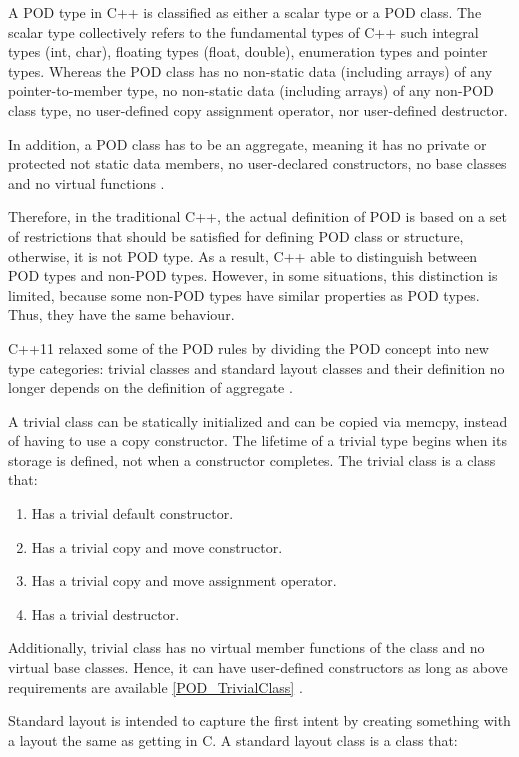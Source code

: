 \documentclass[11pt]{report}
\begin{document}
A POD type in C++ is classified as either a scalar type or a POD class. The scalar type collectively refers to the fundamental types of C++ such integral types (int, char), floating types (float, double), enumeration types and pointer types. Whereas the POD class has no non-static data (including arrays) of any pointer-to-member type, no non-static data (including arrays) of any non-POD class type, no user-defined copy assignment operator, nor user-defined destructor.


In addition, a POD class has to be an aggregate, meaning it has no private or protected not static data members, no user-declared constructors, no base classes and no virtual functions \cite{Kalev:1999:ACP}.


Therefore, in the traditional C++, the actual definition of POD is based on a set of restrictions that should be satisfied for defining POD class or structure, otherwise, it is not POD type. As a result, C++ able to distinguish between POD types and non-POD types. However, in some situations, this distinction is limited, because some non-POD types have similar properties as POD types. Thus, they have the same behaviour.


C++11 relaxed some of the POD rules by dividing the POD concept into new type categories: trivial classes and standard layout classes and their definition no longer depends on the definition of aggregate \cite{MSDN:2012:CppModern}.


A trivial class can be statically initialized and can be copied via memcpy, instead of having to use a copy constructor. The lifetime of a trivial type begins when its storage is defined, not when a constructor completes. The trivial class is a class that:

\begin{enumerate}
\item	Has a trivial default constructor. 
\item	Has a trivial copy and move constructor.
\item	Has a trivial copy and move assignment operator.
\item	Has a trivial destructor.
\end{enumerate}

Additionally, trivial class has no virtual member functions of the class and no virtual base classes. Hence, it can have user-defined constructors as long as above requirements are available \ref{POD_TrivialClass} \cite{ISO:2011:Cpplanguage}.

Standard layout is intended to capture the first intent by creating something with a layout the same as getting in C. A standard layout class is a class that:
\end{document}
